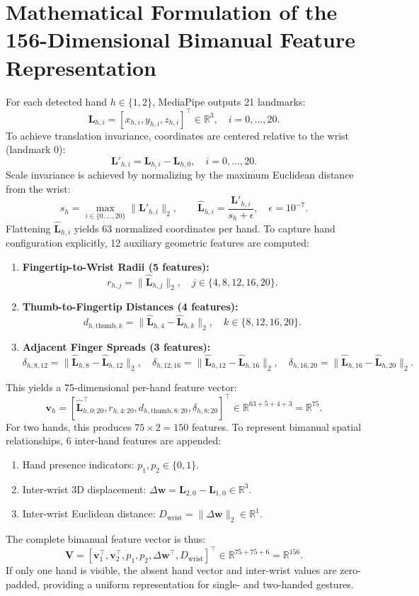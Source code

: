 \section{Mathematical Formulation of the 156-Dimensional Bimanual Feature Representation}
For each detected hand $h \in \{1, 2\}$, MediaPipe outputs 21 landmarks:
\[
\mathbf{L}_{h,i} = [x_{h,i}, y_{h,i}, z_{h,i}]^\top \in \mathbb{R}^3, \quad i = 0, \ldots, 20.
\]
To achieve translation invariance, coordinates are centered relative to the wrist (landmark 0):
\[
\mathbf{L}'_{h,i} = \mathbf{L}_{h,i} - \mathbf{L}_{h,0}, \quad i = 0, \ldots, 20.
\]
Scale invariance is achieved by normalizing by the maximum Euclidean distance from the wrist:
\[
s_h = \max_{i \in \{0,\ldots,20\}} \|\mathbf{L}'_{h,i}\|_2, \qquad \hat{\mathbf{L}}_{h,i} = \frac{\mathbf{L}'_{h,i}}{s_h + \epsilon}, \quad \epsilon = 10^{-7}.
\]
Flattening $\hat{\mathbf{L}}_{h,i}$ yields 63 normalized coordinates per hand. To capture hand configuration explicitly, 12 auxiliary geometric features are computed:
\begin{enumerate}
\item \textbf{Fingertip-to-Wrist Radii (5 features):}
\[
r_{h,j} = \|\hat{\mathbf{L}}_{h,j}\|_2, \quad j \in \{4, 8, 12, 16, 20\}.
\]
\item \textbf{Thumb-to-Fingertip Distances (4 features):}
\[
d_{h,\text{thumb},k} = \|\hat{\mathbf{L}}_{h,4} - \hat{\mathbf{L}}_{h,k}\|_2, \quad k \in \{8, 12, 16, 20\}.
\]
\item \textbf{Adjacent Finger Spreads (3 features):}
\[
\delta_{h,8,12} = \|\hat{\mathbf{L}}_{h,8} - \hat{\mathbf{L}}_{h,12}\|_2, \quad
\delta_{h,12,16} = \|\hat{\mathbf{L}}_{h,12} - \hat{\mathbf{L}}_{h,16}\|_2, \quad
\delta_{h,16,20} = \|\hat{\mathbf{L}}_{h,16} - \hat{\mathbf{L}}_{h,20}\|_2.
\]
\end{enumerate}
This yields a 75-dimensional per-hand feature vector:
\[
\mathbf{v}_h = [\hat{\mathbf{L}}_{h,0:20}^\top, r_{h,4:20}, d_{h,\text{thumb},8:20}, \delta_{h,8:20}]^\top \in \mathbb{R}^{63 + 5 + 4 + 3} = \mathbb{R}^{75}.
\]
For two hands, this produces $75 \times 2 = 150$ features. To represent bimanual spatial relationships, 6 inter-hand features are appended:
\begin{enumerate}
\item Hand presence indicators: $p_1, p_2 \in \{0, 1\}$.
\item Inter-wrist 3D displacement: $\Delta \mathbf{w} = \mathbf{L}_{2,0} - \mathbf{L}_{1,0} \in \mathbb{R}^3$.
\item Inter-wrist Euclidean distance: $D_{\text{wrist}} = \|\Delta \mathbf{w}\|_2 \in \mathbb{R}^1$.
\end{enumerate}
The complete bimanual feature vector is thus:
\[
\mathbf{V} = [\mathbf{v}_1^\top, \mathbf{v}_2^\top, p_1, p_2, \Delta \mathbf{w}^\top, D_{\text{wrist}}]^\top \in \mathbb{R}^{75 + 75 + 6} = \mathbb{R}^{156}.
\]
If only one hand is visible, the absent hand vector and inter-wrist values are zero-padded, providing a uniform representation for single- and two-handed gestures.

